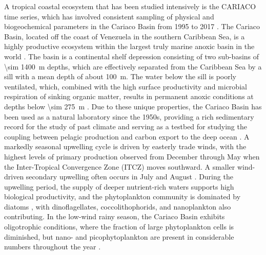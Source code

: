 \documentclass[draft]{agujournal2019}
\begin{document}
    
    A tropical coastal ecosystem that has been studied intensively is the CARIACO time series, which has involved consistent sampling of physical and biogeochemical parameters in the Cariaco Basin from 1995 to 2017 \cite{muller-karger_scientific_2019}. 
    The Cariaco Basin, located off the coast of Venezuela in the southern Caribbean Sea, is a highly productive ecosystem within the largest truly marine anoxic basin in the world \cite{edgcomb_accessing_2011}. The basin is a continental shelf depression consisting of two sub-basins of \qty{\sim 1400}{m} depths, which are effectively separated from the Caribbean Sea by a sill with a mean depth of about \qty{100}{m}. The water below the sill is poorly ventilated, which, combined with the high surface productivity and microbial respiration of sinking organic matter, results in permanent anoxic conditions at depths below \qty{\sim 275}{m} \cite{thunell_organic_2000}. Due to these unique properties, the Cariaco Basin has been used as a natural laboratory since the 1950s, providing a rich sedimentary record for the study of past climate \cite{hughen1996nature} and serving as a testbed for studying the coupling between pelagic production and carbon export to the deep ocean \cite{montes_vertical_2012}.
    A markedly seasonal upwelling cycle is driven by easterly trade winds, with the highest levels of primary production observed from December through May when the Inter-Tropical Convergence Zone (ITCZ) moves southward. A smaller wind-driven secondary upwelling often occurs in July and August \cite{mullerkarger_annual_2001, astor_seasonal_2003}. During the upwelling period, the supply of deeper nutrient-rich waters supports high biological productivity, and the phytoplankton community is dominated by diatoms \cite{romero_seasonal_2009}, with dinoflagellates, coccolithophorids, and nanoplankton also contributing. In the low-wind rainy season, the Cariaco Basin exhibits oligotrophic conditions, where the fraction of large phytoplankton cells is diminished, but nano- and picophytoplankton are present in considerable numbers throughout the year \cite{lorenzoni_characterization_2015}.    
\end{document}

